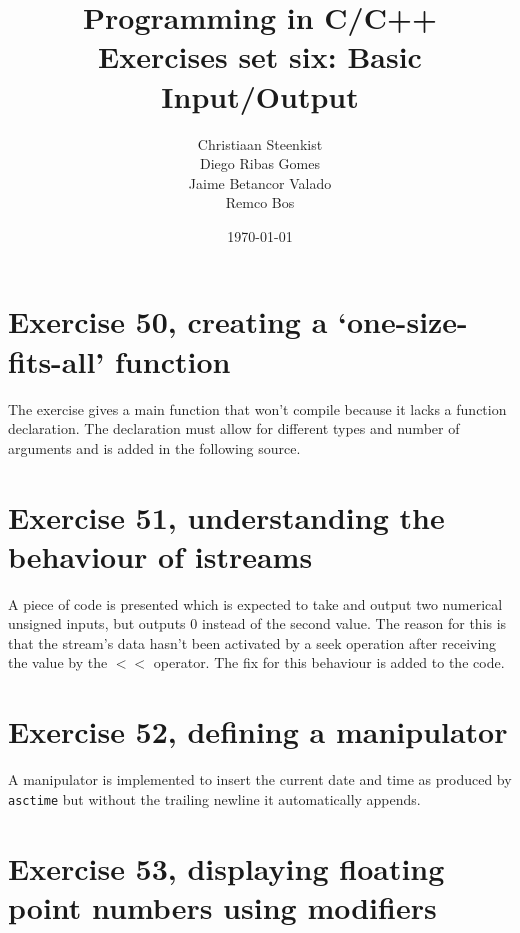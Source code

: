 \documentclass[11pt]{article}
\begin{document}
\title{Programming in C/C++ \\
       Exercises set six: Basic Input/Output
}
\date{\today}
\author{Christiaan Steenkist \\
Diego Ribas Gomes \\
Jaime Betancor Valado \\
Remco Bos \\
}

\maketitle

\section*{Exercise 50, creating a `one-size-fits-all' function}

The exercise gives a main function that won't compile because it lacks a function declaration. The declaration must allow for different types and number of arguments and is added in the following source.



\section*{Exercise 51, understanding the behaviour of istreams}

A piece of code is presented which is expected to take and output two numerical unsigned inputs, but outputs 0 instead of the second value. The reason for this is that the stream's data hasn't been activated by a seek operation after receiving the value by the $<$$<$ operator. The fix for this behaviour is added to the code.



\section*{Exercise 52, defining a manipulator}

A manipulator is implemented to insert the current date and time as produced by \texttt{asctime} but without the trailing newline it automatically appends.



\section*{Exercise 53, displaying floating point numbers using modifiers}
\end{document}
